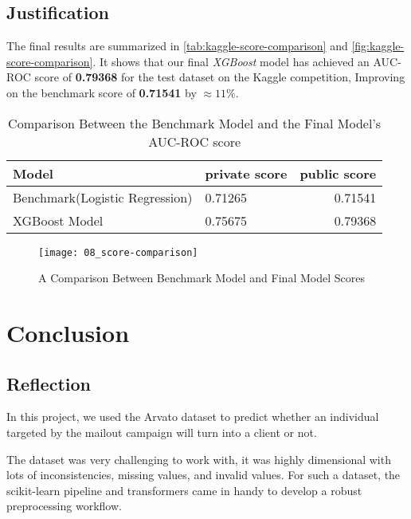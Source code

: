 \documentclass[a4paper]{article}
\begin{document}
{    \pagebreak

    \subsection{Justification}
    \label{sec:justification}
    
    The final results are summarized in \autoref{tab:kaggle-score-comparison} and \autoref{fig:kaggle-score-comparison}. It shows that our final \emph{XGBoost} model has achieved an AUC-ROC score of \textbf{0.79368} for the test dataset on the Kaggle competition, Improving on the benchmark score of \textbf{0.71541} by $\approx 11\%$. 

    \begin{table}[H]
      \centering
      \caption{Comparison Between the Benchmark Model and the Final Model's AUC-ROC score}
      \label{tab:kaggle-score-comparison}
      \begin{tabular}{llr}
        \toprule
        Model & private score & public score \\
        \midrule
        Benchmark(Logistic Regression) & 0.71265 & 0.71541 \\
        XGBoost Model  & 0.75675 & 0.79368 \\
        \bottomrule
      \end{tabular}
    \end{table}

    \begin{figure}[H]
      \centering
      \caption{A Comparison Between Benchmark Model and Final Model Scores}
      \label{fig:kaggle-score-comparison}
      \texttt{[image: 08\_score-comparison]}
    \end{figure}


\pagebreak
    \section{Conclusion}
    
    \subsection{Reflection}
    In this project, we used the Arvato dataset to predict whether an individual targeted by the mailout campaign will turn into a client or not.

    The dataset was very challenging to work with, it was highly dimensional with lots of inconsistencies, missing values, and invalid values. For such a dataset, the scikit-learn pipeline and transformers came in handy to develop a robust preprocessing workflow.

}
\end{document}
